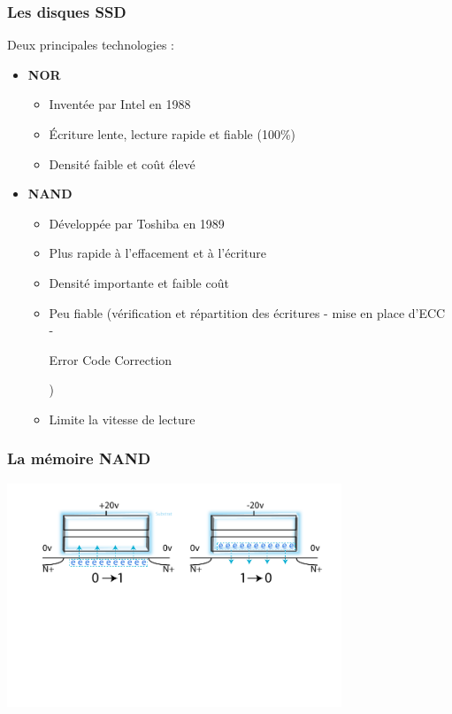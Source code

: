 \begin{frame}
\frametitle{Les disques SSD}
Deux principales technologies :
\begin{itemize}
\item \textbf{NOR}
\begin{itemize}
\item Inventée par Intel en 1988
\item Écriture lente, lecture rapide et fiable (100\%)
\item Densité faible et coût élevé
\end{itemize}
\item \textbf{NAND}
\begin{itemize}
\item Développée par Toshiba en 1989
\item Plus rapide à l'effacement et à l'écriture
\item Densité importante et faible coût
\item Peu fiable (vérification et répartition des écritures - mise en place d'ECC -\begin{tiny} Error Code Correction\end{tiny})
\item Limite la vitesse de lecture
\end{itemize}
\end{itemize}
\end{frame}


\begin{frame}
\frametitle{La mémoire NAND}
\begin{center}
\includegraphics[width=10cm]{../illustration/NAND_modif.pdf}
\end{center}
\end{frame}


